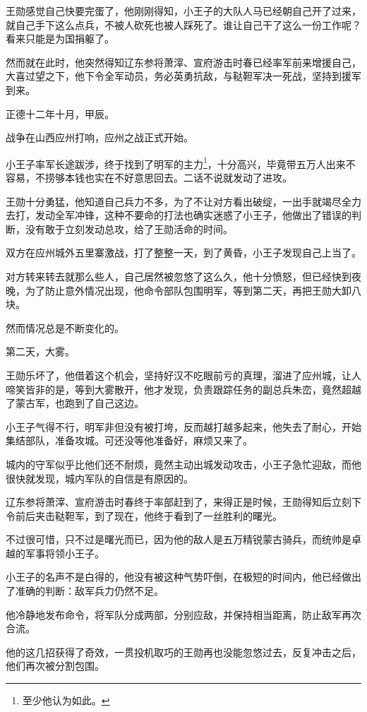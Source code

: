 \begin{multicols}{\theparacolNo}
		王勋感觉自己快要完蛋了，他刚刚得知，小王子的大队人马已经朝自己开了过来，就自己手下这么点兵，不被人砍死也被人踩死了。谁让自己干了这么一份工作呢？看来只能是为国捐躯了。

		然而就在此时，他突然得知辽东参将萧滓、宣府游击时春已经率军前来增援自己，大喜过望之下，他下令全军动员，务必英勇抗敌，与鞑靼军决一死战，坚持到援军到来。

		正德十二年十月，甲辰。

		战争在山西应州打响，应州之战正式开始。

		小王子率军长途跋涉，终于找到了明军的主力\footnote{至少他认为如此。}，十分高兴，毕竟带五万人出来不容易，不捞够本钱也实在不好意思回去。二话不说就发动了进攻。

		王勋十分勇猛，他知道自己兵力不多，为了不让对方看出破绽，一出手就竭尽全力去打，发动全军冲锋，这种不要命的打法也确实迷惑了小王子，他做出了错误的判断，没有敢于立刻发动总攻，给了王勋活命的时间。

		双方在应州城外五里寨激战，打了整整一天，到了黄昏，小王子发现自己上当了。

		对方转来转去就那么些人，自己居然被忽悠了这么久，他十分愤怒，但已经快到夜晚，为了防止意外情况出现，他命令部队包围明军，等到第二天，再把王勋大卸八块。

		然而情况总是不断变化的。

		第二天，大雾。

		王勋乐坏了，他借着这个机会，坚持好汉不吃眼前亏的真理，溜进了应州城，让人啼笑皆非的是，等到大雾散开，他才发现，负责跟踪任务的副总兵朱峦，竟然超越了蒙古军，也跑到了自己这边。

		小王子气得不行，明军非但没有被打垮，反而越打越多起来，他失去了耐心，开始集结部队，准备攻城。可还没等他准备好，麻烦又来了。

		城内的守军似乎比他们还不耐烦，竟然主动出城发动攻击，小王子急忙迎敌，而他很快就发现，城内军队的自信是有原因的。

		辽东参将萧滓、宣府游击时春终于率部赶到了，来得正是时候，王勋得知后立刻下令前后夹击鞑靼军，到了现在，他终于看到了一丝胜利的曙光。

		不过很可惜，只不过是曙光而已，因为他的敌人是五万精锐蒙古骑兵，而统帅是卓越的军事将领小王子。

		小王子的名声不是白得的，他没有被这种气势吓倒，在极短的时间内，他已经做出了准确的判断：敌军兵力仍然不足。

		他冷静地发布命令，将军队分成两部，分别应敌，并保持相当距离，防止敌军再次合流。

		他的这几招获得了奇效，一贯投机取巧的王勋再也没能忽悠过去，反复冲击之后，他们再次被分割包围。


\end{multicols}
